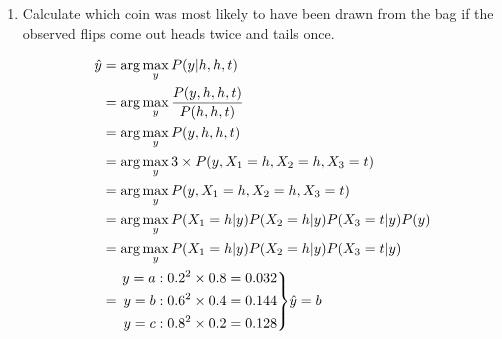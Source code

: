 \documentclass[9pt,a4paper]{extarticle}
\newenvironment{solution}
    {%
    \color{red}
    }
    { 
    \color{black}
    }
\newenvironment{rcases}
  {\left.\begin{aligned}}
  {\end{aligned}\right\rbrace}
\begin{document}
\begin{enumerate}
\begin{solution}
    \end{solution}
    \item Calculate which coin was most likely to have been drawn from the bag if the observed
flips come out heads twice and tails once.
\begin{solution}
\begin{align*}
    \hat{y} &= \arg\max_y P(y|h, h, t)\\
    &= \arg\max_y \frac{P(y, h, h, t)}{P(h, h, t)}\\
    &= \arg\max_y P(y, h, h, t)\\
    &= \arg\max_y 3 \times P(y, X_1 = h, X_2 = h, X_3 = t)\\
    &= \arg\max_y P(y, X_1 = h, X_2 = h, X_3 = t)\\
     &= \arg\max_y P(X_1 = h|y) P(X_2 = h|y) P(X_3 = t|y)P(y)\\
     &=\arg\max_y P(X_1 = h|y) P(X_2 = h|y) P(X_3 = t|y)\\
     &=\begin{rcases}
    y=a &: 0.2^2\times 0.8 = 0.032 \\
    y=b &: 0.6^2\times 0.4=0.144 \\
    y=c &: 0.8^2 \times 0.2=0.128
\end{rcases}
\text{$\hat{y} = b$}\\
\end{align*}
\end{solution}
\end{enumerate}
\end{document}
